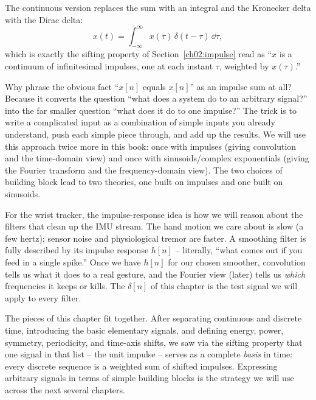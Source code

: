 The continuous version replaces the sum with an integral and the Kronecker delta
with the Dirac delta:
\[
  x(t) = \int_{-\infty}^{\infty} x(\tau)\,\delta(t-\tau)\,\dd\tau,
\]
which is exactly the sifting property of Section~\ref{ch02:impulse} read as ``$x$ is
a continuum of infinitesimal impulses, one at each instant $\tau$, weighted by
$x(\tau)$.''

\begin{whybox}
Why phrase the obvious fact ``$x[n]$ equals $x[n]$'' as an impulse sum at all?
Because it converts the question ``what does a system do to an arbitrary signal?''
into the far smaller question ``what does it do to one impulse?'' The trick is to
write a complicated input as a combination of simple inputs you already understand,
push each simple piece through, and add up the results. We will use this approach
twice more in this book: once with impulses (giving convolution and the
time-domain view) and once with sinusoids/complex exponentials (giving the Fourier
transform and the frequency-domain view). The two choices of building block lead to two
theories, one built on impulses and one built on sinusoids.
\end{whybox}

\begin{goalbox}
For the wrist tracker, the impulse-response idea is how we will reason about the
filters that clean up the IMU stream. The hand motion we care about is slow (a few
hertz); sensor noise and physiological tremor are faster. A smoothing filter is
fully described by its impulse response $h[n]$ -- literally, ``what comes out if you
feed in a single spike.'' Once we have $h[n]$ for our chosen smoother, convolution
tells us what it does to a real gesture, and the Fourier view (later) tells us
\emph{which} frequencies it keeps or kills. The $\delta[n]$ of this
chapter is the test signal we will apply to every filter.
\end{goalbox}

\begin{aestheticbox}
The pieces of this chapter fit together. After separating continuous and
discrete time, introducing the basic elementary signals, and defining energy, power,
symmetry, periodicity, and time-axis shifts, we saw via the sifting property that
one signal in that list -- the unit impulse -- serves as a complete \emph{basis} in
time: every discrete sequence is a weighted sum of shifted impulses. Expressing
arbitrary signals in terms of simple building blocks is the strategy we will use
across the next several chapters.
\end{aestheticbox}

